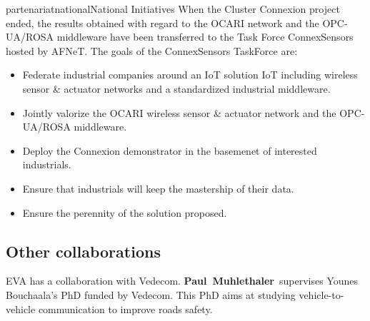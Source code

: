 \documentclass{ra2016}
\newcommand{\paul}  {\textbf{Paul~Muhlethaler}}
\begin{document}
\begin{module}{partenariat}{national}{National Initiatives}
When the Cluster Connexion project ended, the results obtained with regard to the OCARI network and the OPC-UA/ROSA middleware have been transferred to the Task Force ConnexSensors hosted by AFNeT. The goals of the ConnexSensors TaskForce are:
\begin{itemize}
\item	Federate industrial companies around an IoT solution IoT including wireless sensor \& actuator networks and a standardized industrial middleware.
\item Jointly valorize the OCARI wireless sensor \& actuator network and the OPC-UA/ROSA middleware.
\item Deploy the Connexion demonstrator in the basemenet of interested industrials. 
\item Ensure that industrials will keep the mastership of their data. 
\item Ensure the perennity of the solution proposed.\\
\end{itemize}





\subsection{Other collaborations}


EVA has a collaboration with Vedecom. 
\paul~supervises Younes Bouchaala's PhD funded by Vedecom. This PhD aims at 
studying vehicle-to-vehicle communication to improve roads safety. 

\end{module} 




\end{document}
